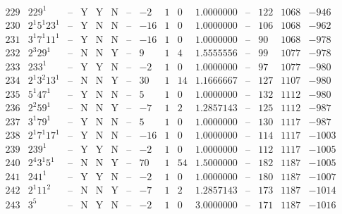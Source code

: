 \documentclass[11pt,reqno,a4letter]{article}
\numberwithin{figure}{section}
\numberwithin{table}{section}
\theoremstyle{plain}
\numberwithin{theorem}{section}
\theoremstyle{definition}
\begin{document}
\begin{table}[h!]
\begin{equation*}
{\begin{array}{|cc|c|ccc|c|c|ccc|c|ccc}
 229 & 229^1 & \text{--} & \text{Y} & \text{Y} & \text{N} & \text{--} & -2 & 1 & 0 & 1.0000000 & \text{--} & 122 & 1068 & -946 \\
 230 & 2^1 5^1 23^1 & \text{--} & \text{Y} & \text{N} & \text{N} & \text{--} & -16 & 1 & 0 & 1.0000000 & \text{--} & 106 & 1068 & -962 \\
 231 & 3^1 7^1 11^1 & \text{--} & \text{Y} & \text{N} & \text{N} & \text{--} & -16 & 1 & 0 & 1.0000000 & \text{--} & 90 & 1068 & -978 \\
 232 & 2^3 29^1 & \text{--} & \text{N} & \text{N} & \text{Y} & \text{--} & 9 & 1 & 4 & 1.5555556 & \text{--} & 99 & 1077 & -978 \\
 233 & 233^1 & \text{--} & \text{Y} & \text{Y} & \text{N} & \text{--} & -2 & 1 & 0 & 1.0000000 & \text{--} & 97 & 1077 & -980 \\
 234 & 2^1 3^2 13^1 & \text{--} & \text{N} & \text{N} & \text{Y} & \text{--} & 30 & 1 & 14 & 1.1666667 & \text{--} & 127 & 1107 & -980 \\
 235 & 5^1 47^1 & \text{--} & \text{Y} & \text{N} & \text{N} & \text{--} & 5 & 1 & 0 & 1.0000000 & \text{--} & 132 & 1112 & -980 \\
 236 & 2^2 59^1 & \text{--} & \text{N} & \text{N} & \text{Y} & \text{--} & -7 & 1 & 2 & 1.2857143 & \text{--} & 125 & 1112 & -987 \\
 237 & 3^1 79^1 & \text{--} & \text{Y} & \text{N} & \text{N} & \text{--} & 5 & 1 & 0 & 1.0000000 & \text{--} & 130 & 1117 & -987 \\
 238 & 2^1 7^1 17^1 & \text{--} & \text{Y} & \text{N} & \text{N} & \text{--} & -16 & 1 & 0 & 1.0000000 & \text{--} & 114 & 1117 & -1003 \\
 239 & 239^1 & \text{--} & \text{Y} & \text{Y} & \text{N} & \text{--} & -2 & 1 & 0 & 1.0000000 & \text{--} & 112 & 1117 & -1005 \\
 240 & 2^4 3^1 5^1 & \text{--} & \text{N} & \text{N} & \text{Y} & \text{--} & 70 & 1 & 54 & 1.5000000 & \text{--} & 182 & 1187 & -1005 \\
 241 & 241^1 & \text{--} & \text{Y} & \text{Y} & \text{N} & \text{--} & -2 & 1 & 0 & 1.0000000 & \text{--} & 180 & 1187 & -1007 \\
 242 & 2^1 11^2 & \text{--} & \text{N} & \text{N} & \text{Y} & \text{--} & -7 & 1 & 2 & 1.2857143 & \text{--} & 173 & 1187 & -1014 \\
 243 & 3^5 & \text{--} & \text{N} & \text{Y} & \text{N} & \text{--} & -2 & 1 & 0 & 3.0000000 & \text{--} & 171 & 1187 & -1016 \\

\end{array}}
\end{equation*}
\end{table}
\end{document}
